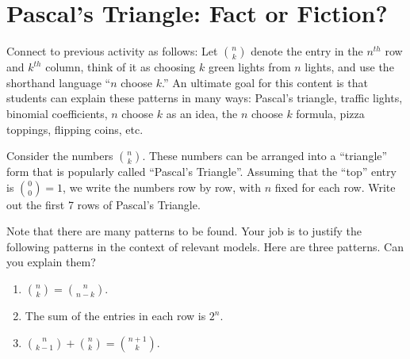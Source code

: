 \newpage
\section{Pascal's Triangle: Fact or Fiction?}\label{A:factOrFiction}

\begin{teachingnote}
Connect to previous activity as follows:  Let $\binom{n}{k}$ denote the entry in the $n^{th}$ row and $k^{th}$ column, think of it as choosing $k$ green lights from $n$ lights, and use the shorthand language ``$n$ choose $k$.''  An ultimate goal for this content is that students can explain these patterns in many ways: Pascal's triangle, traffic lights, binomial coefficients, $n$ choose $k$ as an idea, the $n$ choose $k$ formula, pizza toppings, flipping coins, etc.
\end{teachingnote}
Consider the numbers $\binom{n}{k}$.  These numbers can be arranged
into a ``triangle'' form that is popularly called ``Pascal's
Triangle''.  Assuming that the ``top'' entry is $\binom{0}{0}=1$, we
write the numbers row by row, with $n$ fixed for each row.  Write out
the first 7 rows of Pascal's Triangle.

\vspace{3in}


Note that there are many patterns to be found.  Your job is to justify
the following patterns in the context of relevant models. Here are three patterns.  Can you explain them?
\begin{enumerate}
\item $\binom{n}{k} = \binom{n}{n-k}$.
\item The sum of the entries in each row is $2^n$.
\item $\binom{n}{k-1} + \binom{n}{k} = \binom{n+1}{k}$.
\end{enumerate}


